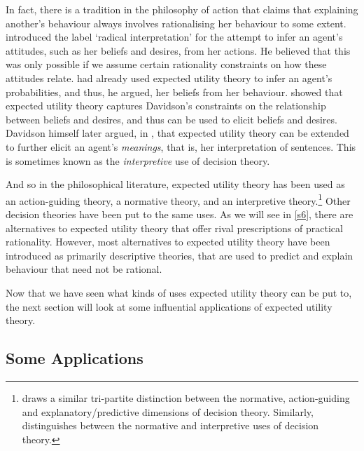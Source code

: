 In fact, there is a tradition in the philosophy of action that claims that explaining another's behaviour always involves rationalising her behaviour to some extent. \citet{Davidson1973} introduced the label `radical interpretation' for the attempt to infer an agent's attitudes, such as her beliefs and desires, from her actions. He believed that this was only possible if we assume certain rationality constraints on how these attitudes relate. \citet{Ramsey1926} had already used expected utility theory to infer an agent's probabilities, and thus, he argued, her beliefs from her behaviour. \citet{Lewis1974} showed that expected utility theory captures Davidson's constraints on the relationship between beliefs and desires, and thus can be used to elicit beliefs and desires. Davidson himself later argued, in \citet{Davidson1985}, that expected utility theory can be extended to further elicit an agent's {\em meanings}, that is, her interpretation of sentences. This is sometimes known as the {\em interpretive} use of decision theory.

And so in the philosophical literature, expected utility theory has been used as an action-guiding theory, a normative theory, and an interpretive theory.\footnote{\citet{Bermudez2009} draws a similar tri-partite distinction between the normative, action-guiding and explanatory/predictive dimensions of decision theory. Similarly, \citet{Buchak2016} distinguishes between the normative and interpretive uses of decision theory.} Other decision theories have been put to the same uses. As we will see in \autoref{s6}, there are alternatives to expected utility theory that offer rival prescriptions of practical rationality. However, most alternatives to expected utility theory have been introduced as primarily descriptive theories, that are used to predict and explain behaviour that need not be rational.

Now that we have seen what kinds of uses expected utility theory can be put to, the next section will look at some influential applications of expected utility theory.

\subsection{Some Applications}\label{subs131}

